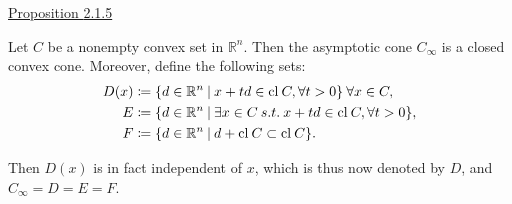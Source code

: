 \documentclass[a4paper,11pt]{jsarticle}
\newcommand{\PROPOSITION}[2]{\begin{itembox}[l]{\underline{Proposition {#1} }}{#2}\end{itembox}}
\newcommand{\NDemenstionalRealEuclidianSpace}{\mathbb{R}^n}
\begin{document}
\PROPOSITION{2.1.5}{
  Let $C$ be a nonempty convex set in $\NDemenstionalRealEuclidianSpace$. Then the asymptotic cone $C_{\infty}$ is a closed convex cone. Moreover, define the following sets:
  \begin{equation}
    \begin{split}
      D(x) &\coloneqq \{d \in \NDemenstionalRealEuclidianSpace \:|\: x + td \in \text{cl}\:C, \forall t >0\}\: \forall x \in C, \\
      E &\coloneqq \{d \in \NDemenstionalRealEuclidianSpace \:|\: \exists x \in C \:s.t.\: x + td \in \text{cl}\:C, \forall t > 0\}, \\
      F &\coloneqq \{d \in \NDemenstionalRealEuclidianSpace \:|\: d + \text{cl}\:C \subset \text{cl}\:C\}. \notag
    \end{split}
  \end{equation}

  Then $D(x)$ is in fact independent of $x$, which is thus now denoted by $D$, and $C_{\infty} = D = E = F$.
}
\end{document}
